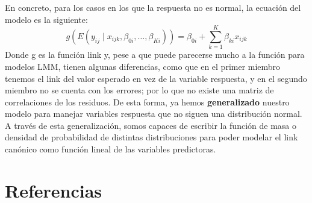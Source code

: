 \documentclass[
  letterpaper,
  DIV=11,
  numbers=noendperiod]{scrreprt}
\newlength{\cslhangindent}
\newenvironment{CSLReferences}[2] %
 {\begin{list}{}{%
  \setlength{\itemindent}{0pt}
  \setlength{\leftmargin}{0pt}
  \setlength{\parsep}{0pt}
  \ifodd #1
   \setlength{\leftmargin}{\cslhangindent}
   \setlength{\itemindent}{-1\cslhangindent}
  \fi
  \setlength{\itemsep}{#2\baselineskip}}}
 {\end{list}}
\begin{document}
En concreto, para los casos en los que la respuesta no es normal, la
ecuación del modelo es la siguiente: \[
g\left(E(y_{ij} \mid x_{ijk}, \beta_{0i}, \dots, \beta_{Ki})\right) = \beta_{0i} + \sum_{k=1}^{K} \beta_{ki}x_{ijk}
\] Donde g es la función link y, pese a que puede parecerse mucho a la
función para modelos LMM, tienen algunas diferencias, como que en el
primer miembro tenemos el link del valor esperado en vez de la variable
respuesta, y en el segundo miembro no se cuenta con los errores; por lo
que no existe una matriz de correlaciones de los residuos. De esta
forma, ya hemos \textbf{generalizado} nuestro modelo para manejar
variables respuesta que no siguen una distribución normal. A través de
esta generalización, somos capaces de escribir la función de masa o
densidad de probabilidad de distintas distribuciones para poder modelar
el link canónico como función lineal de las variables predictoras.


\chapter*{Referencias}\label{referencias}


\label{refs}
\begin{CSLReferences}{0}{1}
\end{CSLReferences}
\end{document}
